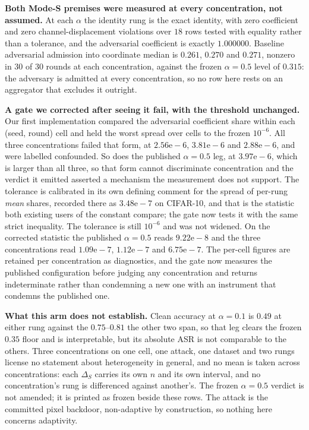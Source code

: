 \documentclass{article}
\begin{document}
\textbf{Both Mode-S premises were measured at every concentration, not assumed.} At each $\alpha$ the identity rung is the exact identity, with zero coefficient and zero channel-displacement violations over $18$ rows tested with equality rather than a tolerance, and the adversarial coefficient is exactly $1.000000$. Baseline adversarial admission into coordinate median is $0.261$, $0.270$ and $0.271$, nonzero in $30$ of $30$ rounds at each concentration, against the frozen $\alpha{=}0.5$ level of $0.315$: the adversary is admitted at every concentration, so no row here rests on an aggregator that excludes it outright.

\textbf{A gate we corrected after seeing it fail, with the threshold unchanged.} Our first implementation compared the adversarial coefficient share within each (seed, round) cell and held the worst spread over cells to the frozen $10^{-6}$. All three concentrations failed that form, at $2.56\mathrm{e}{-}6$, $3.81\mathrm{e}{-}6$ and $2.88\mathrm{e}{-}6$, and were labelled confounded. So does the published $\alpha{=}0.5$ leg, at $3.97\mathrm{e}{-}6$, which is larger than all three, so that form cannot discriminate concentration and the verdict it emitted asserted a mechanism the measurement does not support. The tolerance is calibrated in its own defining comment for the spread of per-rung \emph{mean} shares, recorded there as $3.48\mathrm{e}{-}7$ on CIFAR-10, and that is the statistic both existing users of the constant compare; the gate now tests it with the same strict inequality. The tolerance is still $10^{-6}$ and was not widened. On the corrected statistic the published $\alpha{=}0.5$ reads $9.22\mathrm{e}{-}8$ and the three concentrations read $1.09\mathrm{e}{-}7$, $1.12\mathrm{e}{-}7$ and $6.75\mathrm{e}{-}7$. The per-cell figures are retained per concentration as diagnostics, and the gate now measures the published configuration before judging any concentration and returns indeterminate rather than condemning a new one with an instrument that condemns the published one.

\textbf{What this arm does not establish.} Clean accuracy at $\alpha{=}0.1$ is $0.49$ at either rung against the $0.75$--$0.81$ the other two span, so that leg clears the frozen $0.35$ floor and is interpretable, but its absolute ASR is not comparable to the others. Three concentrations on one cell, one attack, one dataset and two rungs license no statement about heterogeneity in general, and no mean is taken across concentrations: each $\Delta_S$ carries its own $n$ and its own interval, and no concentration's rung is differenced against another's. The frozen $\alpha{=}0.5$ verdict is not amended; it is printed as frozen beside these rows. The attack is the committed pixel backdoor, non-adaptive by construction, so nothing here concerns adaptivity.
\end{document}

